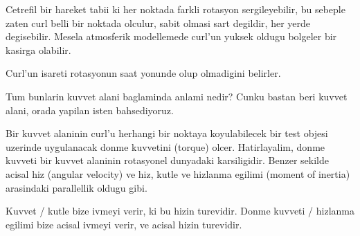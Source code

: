 \documentclass[12pt,fleqn]{article}
\begin{document}
Cetrefil bir hareket tabii ki her noktada farkli rotasyon sergileyebilir,
bu sebeple zaten curl belli bir noktada olculur, sabit olmasi sart
degildir, her yerde degisebilir. Mesela atmosferik modellemede curl'un
yuksek oldugu bolgeler bir kasirga olabilir. 

Curl'un isareti rotasyonun saat yonunde olup olmadigini belirler. 

Tum bunlarin kuvvet alani baglaminda anlami nedir? Cunku bastan beri kuvvet
alani, orada yapilan isten bahsediyoruz. 

Bir kuvvet alaninin curl'u herhangi bir noktaya koyulabilecek bir test
objesi uzerinde uygulanacak donme kuvvetini (torque) olcer. Hatirlayalim,
donme kuvveti bir kuvvet alaninin rotasyonel dunyadaki karsiligidir. Benzer
sekilde acisal hiz (angular velocity) ve hiz, kutle ve hizlanma egilimi
(moment of inertia) arasindaki parallellik oldugu gibi. 

Kuvvet / kutle bize ivmeyi verir, ki bu hizin turevidir. Donme kuvveti /
hizlanma egilimi bize acisal ivmeyi verir, ve acisal hizin turevidir. 
\end{document}
